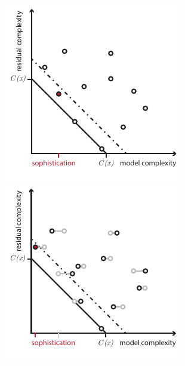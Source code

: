 \documentclass{style/llncs}
\begin{document}
\begin{figure}[tb]
  \vspace{-2\baselineskip}
  \centering
  \begin{minipage}{0.40\textwidth}
     \includegraphics[width=\textwidth]{./img/sophistication.pdf}
  \end{minipage}
  \begin{minipage}{0.40\textwidth}
     \includegraphics[width=\textwidth]{./img/sophistication-jump.pdf}

\end{minipage}
\end{figure}
\end{document}

